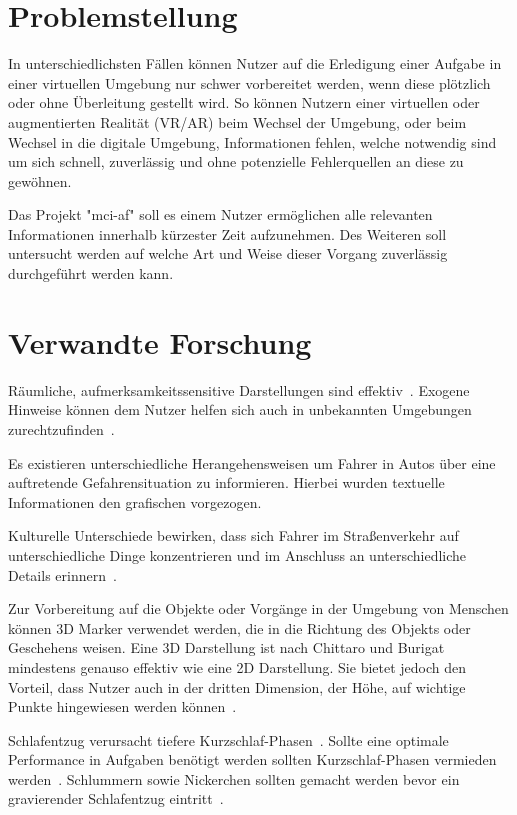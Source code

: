 \documentclass[a4paper, 11pt]{article}
\newcommand{\projectName}{mci-af}
\begin{document}
\section*{Problemstellung}
In unterschiedlichsten Fällen können Nutzer auf die Erledigung einer Aufgabe in einer virtuellen Umgebung nur schwer vorbereitet werden, wenn diese  plötzlich oder ohne Überleitung gestellt wird. So können Nutzern einer virtuellen oder augmentierten Realität (VR/AR) beim Wechsel der Umgebung, oder beim Wechsel in die digitale Umgebung, Informationen fehlen, welche notwendig sind um sich schnell, zuverlässig und ohne potenzielle Fehlerquellen an diese zu gewöhnen. 

Das Projekt "\projectName" soll es einem Nutzer ermöglichen alle relevanten Informationen innerhalb kürzester Zeit aufzunehmen. Des Weiteren soll untersucht werden auf welche Art und Weise dieser Vorgang zuverlässig durchgeführt werden kann.

\section*{Verwandte Forschung}
Räumliche, aufmerksamkeitssensitive Darstellungen sind effektiv~\cite{bonanni2005attention}. Exogene Hinweise können dem Nutzer helfen sich auch in unbekannten Umgebungen zurechtzufinden~\cite{bonanni2005attention}.

Es existieren unterschiedliche Herangehensweisen um Fahrer in Autos über eine auftretende Gefahrensituation zu informieren. Hierbei wurden textuelle Informationen den grafischen vorgezogen.~\cite{green1995hazard}

Kulturelle Unterschiede bewirken, dass sich Fahrer im Straßenverkehr auf unterschiedliche Dinge konzentrieren und im Anschluss an unterschiedliche Details erinnern~\cite{yumiko2017VisAttention}.

Zur Vorbereitung auf die Objekte oder Vorgänge in der Umgebung von Menschen können 3D Marker verwendet werden, die in die Richtung des Objekts oder Geschehens weisen. Eine 3D Darstellung ist nach Chittaro und Burigat mindestens genauso effektiv wie eine 2D Darstellung. Sie bietet jedoch den Vorteil, dass Nutzer auch in der dritten Dimension, der Höhe, auf wichtige Punkte hingewiesen werden können~\cite{chittaro20043d}.

Schlafentzug verursacht tiefere Kurzschlaf-Phasen~\cite{dinges1985assessing}. Sollte eine optimale Performance in Aufgaben benötigt werden sollten Kurzschlaf-Phasen vermieden werden~\cite{dinges1985assessing}. Schlummern sowie Nickerchen sollten gemacht werden bevor ein gravierender Schlafentzug eintritt~\cite{dinges1985assessing}.
\end{document}
